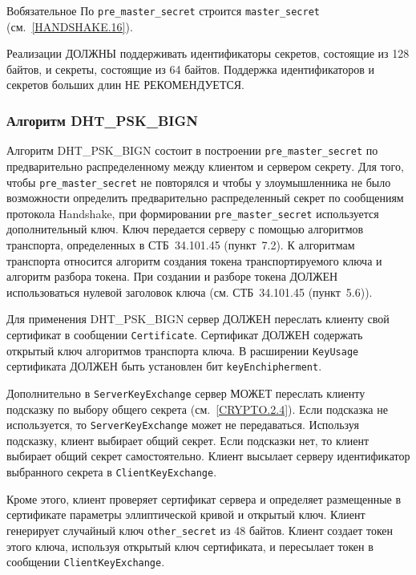 \begin{appendix}{В}{обязательное}
По \lstinline{pre_master_secret} строится \lstinline{master_secret} 
(см.~\ref{HANDSHAKE.16}). 

Реализации ДОЛЖНЫ поддерживать идентификаторы секретов, состоящие из 128 
байтов, и секреты, состоящие из 64 байтов. Поддержка идентификаторов и 
секретов больших длин НЕ РЕКОМЕНДУЕТСЯ. 

\subsubsection{Алгоритм DHT\_PSK\_BIGN}\label{BSUITES.2.3.4}

Алгоритм DHT\_PSK\_BIGN состоит в построении \lstinline{pre_master_secret} по 
предварительно распределенному между клиентом и сервером секрету. Для 
того, чтобы \lstinline{pre_master_secret} не повторялся и чтобы у злоумышленника не 
было возможности определить предварительно распределенный секрет по 
сообщениям протокола Handshake, при формировании 
\lstinline{pre_master_secret} используется дополнительный ключ. Ключ 
передается серверу с помощью алгоритмов транспорта, определенных в 
СТБ~34.101.45 (пункт~7.2). К алгоритмам транспорта относится алгоритм 
создания  токена транспортируемого ключа и алгоритм разбора токена. При 
создании и разборе токена ДОЛЖЕН использоваться нулевой заголовок ключа 
(см. СТБ~34.101.45 (пункт~5.6)).  

Для применения DHT\_PSK\_BIGN сервер ДОЛЖЕН переслать клиенту свой 
сертификат в сообщении \lstinline{Certificate}. Сертификат ДОЛЖЕН содержать открытый 
ключ алгоритмов транспорта ключа. В расширении \lstinline{KeyUsage} сертификата ДОЛЖЕН 
быть установлен бит \lstinline{keyEnchipherment}. 

Дополнительно в \lstinline{ServerKeyExchange} сервер МОЖЕТ переслать клиенту подсказку 
по выбору общего секрета (см.~\ref{CRYPTO.2.4}). Если подсказка не используется, то 
\lstinline{ServerKeyExchange} может не передаваться. Используя подсказку, клиент 
выбирает общий секрет. Если подсказки нет, то клиент выбирает общий секрет 
самостоятельно. Клиент высылает серверу идентификатор выбранного секрета  
в \lstinline{ClientKeyExchange}. 

Кроме этого, клиент проверяет сертификат сервера и определяет размещенные 
в сертификате параметры эллиптической кривой и открытый ключ. Клиент 
генерирует случайный ключ \lstinline{other_secret} из 48 байтов. Клиент 
создает токен этого ключа, используя открытый ключ сертификата, и 
пересылает токен в сообщении \lstinline{ClientKeyExchange}.  


\end{appendix}
